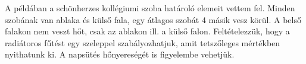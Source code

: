 



 A példában a schönherzes kollégiumi szoba határoló elemeit vettem fel. Minden szobának van ablaka és külső fala, egy átlagos szobát 4 másik vesz körül. A belső falakon nem veszt hőt, csak az ablakon ill. a külső falon. Feltételezzük, hogy a radiátoros fűtést egy szeleppel szabályozhatjuk, amit tetszőleges mértékben nyithatunk ki.
 A napsütés hőnyereségét is figyelembe vehetjük.%










%
%
%

